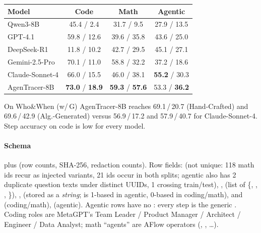 \begin{center}\small
\begin{tabular}{@{}lccc@{}}\toprule
Model & Code & Math & Agentic\\\midrule
Qwen3-8B & 45.4 / 2.4 & 31.7 / 9.5 & 27.9 / 13.5\\
GPT-4.1 & 59.8 / 12.6 & 39.6 / 35.8 & 43.6 / 25.0\\
DeepSeek-R1 & 11.8 / 10.2 & 42.7 / 29.5 & 45.1 / 27.1\\
Gemini-2.5-Pro & 70.1 / 11.0 & 58.8 / 32.2 & 37.2 / 18.6\\
Claude-Sonnet-4 & 66.0 / 15.5 & 46.0 / 38.1 & \textbf{55.2} / 30.3\\
AgenTracer-8B & \textbf{73.0} / \textbf{18.9} & \textbf{59.3} / \textbf{57.6} & 53.3 / \textbf{36.2}\\\bottomrule
\end{tabular}
\end{center}
On Who\&When (w/\,G) AgenTracer-8B reaches 69.1\,/\,20.7 (Hand-Crafted) and 69.6\,/\,42.9 (Alg.-Generated) versus 56.9\,/\,17.2 and 57.9\,/\,40.7 for Claude-Sonnet-4. Step accuracy on code is low for every model.

\paragraph{Schema}  plus  (row counts, SHA-256, redaction counts). Row fields:  (not unique: 118 math ids recur as injected variants, 21 ids occur in both splits; agentic also has 2 duplicate question texts under distinct UUIDs, 1 crossing train/test), ,  (list of \{, , , \}), ,  (stored as a \emph{string};  is 1-based in agentic, 0-based in coding/math),  and  (coding/math),  (agentic). Agentic rows have no : every step is the generic . Coding roles are MetaGPT's Team Leader / Product Manager / Architect / Engineer / Data Analyst; math ``agents'' are AFlow operators (, , \ldots).

